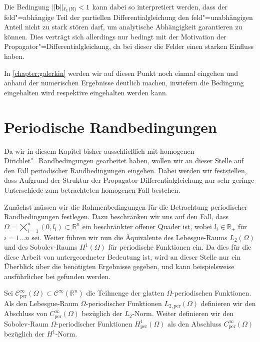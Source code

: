 \documentclass[../main.tex]{subfiles}
\begin{document}
Die Bedingung $\lVert\mathbf{b}\rVert_{\ell_{1}(\mathbb{N})} < 1$ kann dabei so interpretiert werden, dass der feld"=abhängige Teil der partiellen Differentialgleichung den feld"=unabhängigen Anteil nicht zu stark stören darf, um analytische Abhängigkeit garantieren zu können.
Dies verträgt sich allerdings nur bedingt mit der Motivation der Propagator"=Differentialgleichung, da bei dieser die Felder einen starken Einfluss haben.

In \cref{chapter:galerkin} werden wir auf diesen Punkt noch einmal eingehen und anhand der numerischen Ergebnisse deutlich machen, inwiefern die Bedingung eingehalten wird respektive eingehalten werden kann.

\section{Periodische Randbedingungen} %
\label{section:periodische_randbedingungen}

Da wir in diesem Kapitel bisher ausschließlich mit homogenen Dirichlet"=Randbedingungen gearbeitet haben, wollen wir an dieser Stelle auf den Fall periodischer Randbedingungen eingehen.
Dabei werden wir feststellen, dass Aufgrund der Struktur der Propagator-Differentialgleichung nur sehr geringe Unterschiede zum betrachteten homogenen Fall bestehen.

Zunächst müssen wir die Rahmenbedingungen für die Betrachtung periodischer Randbedingungen festlegen.
Dazu beschränken wir uns auf den Fall, dass $\Omega = \bigtimes_{i = 1}^{n} (0, l_{i}) \subset \mathbb{R}^{n}$ ein beschränkter offener Quader ist, wobei $l_{i} \in \mathbb{R}_{+}$ für $i = 1 \dots n$ sei.
Weiter führen wir nun die Äquivalente des Lebesgue-Raums $L_{2}(\Omega)$ und des Sobolev-Raums $H^{1}(\Omega)$ für periodische Funktionen ein.
Da dies für die diese Arbeit von untergeordneter Bedeutung ist, wird an dieser Stelle nur ein Überblick über die benötigten Ergebnisse gegeben, und kann beispielsweise ausführlicher bei \textcite{Han2009} gefunden werden.

\begin{Definition}
\label{definition:periodische_sobolev_raeume}
    Sei $\mathcal C_{\text{per}}^{\infty}(\Omega) \subset \mathcal C^{\infty}(\mathbb{R}^{n})$ die Teilmenge der glatten $\Omega$-periodischen Funktionen.
    Als den Lebesgue-Raum $\Omega$-periodischer Funktionen $L_{2,\text{per}}(\Omega)$  definieren wir den Abschluss von $C_{\text{per}}^{\infty}(\Omega)$ bezüglich der $L_{2}$-Norm.
    Weiter definieren wir den Sobolev-Raum $\Omega$-periodischer Funktionen $H^{1}_{\text{per}}(\Omega)$ als den Abschluss $C_{\text{per}}^{\infty}(\Omega)$ bezüglich der $H^{1}$-Norm.
\end{Definition}
\end{document}
